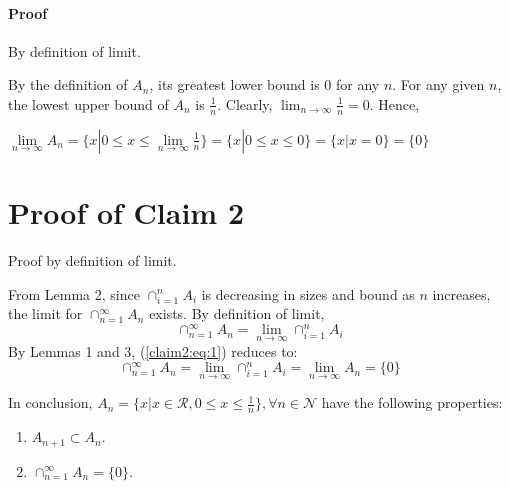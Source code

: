 \documentclass[14pt]{extarticle}
\begin{document}
	\paragraph{Proof} By definition of limit.
	\par\bigskip
	By the definition of $A_n$, its greatest lower bound is 0 for any $n$.  For any given $n$, the lowest upper bound of $A_n$ is $\frac{1}{n}$.  Clearly, $\lim_{n \to \infty} \frac{1}{n} = 0$.  Hence,
	\begin{center}
		$\lim\limits_{n \to \infty} A_n = \{x| 0 \le x \le \lim\limits_{n \to \infty} \frac{1}{n}\} = \{x| 0 \le x \le 0\} = \{x| x = 0\} = \{0\}$	
	\end{center} 
	\section{Proof of Claim 2}
	Proof by definition of limit.
	\par\bigskip
	From Lemma 2, since $\cap_{i=1}^n A_i$ is decreasing in sizes and bound as $n$ increases, the limit for $\cap_{n=1}^\infty A_n$ exists. By definition of limit,
	\begin{equation}\label{claim2:eq:1}
		\cap_{n=1}^\infty A_n = \lim_{n \to \infty} \cap_{i=1}^n A_i
	\end{equation}
	By Lemmas 1 and 3, (\ref{claim2:eq:1}) reduces to:
	\begin{equation}\label{claim2:eq:2}
	\cap_{n=1}^\infty A_n = \lim_{n \to \infty} \cap_{i=1}^n A_i = \lim_{n \to \infty} A_n = \{0\}
	\end{equation} 
	\par\bigskip
	In conclusion, $A_n = \{x|x \in \mathcal{R}, 0 \le x \le \frac{1}{n}\}, \forall n \in \mathcal{N}$ have the following properties:
	\begin{enumerate}
		\item $A_{n+1} \subset A_n$.
		\item $\cap_{n=1}^\infty A_n=\{0\}$.
	\end{enumerate}
\end{document}
